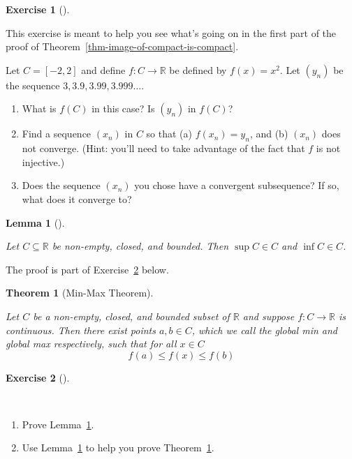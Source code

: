 \documentclass[
  letterpaper,
  DIV=11,
  numbers=noendperiod]{scrreprt}
\providecommand{\tightlist}{%
  \setlength{\itemsep}{0pt}\setlength{\parskip}{0pt}}
\def\R{\mathbb R}
\theoremstyle{plain}
\newtheorem{theorem}{Theorem}[chapter]
\theoremstyle{definition}
\newtheorem{exercise}{Exercise}[chapter]
\theoremstyle{plain}
\theoremstyle{plain}
\newtheorem{lemma}{Lemma}[chapter]
\theoremstyle{definition}
\theoremstyle{definition}
\theoremstyle{remark}
\begin{document}
\begin{exercise}[]\protect\hypertarget{exr-non-unique-preimage}{}\label{exr-non-unique-preimage}

This exercise is meant to help you see what's going on in the first part
of the proof of Theorem~\ref{thm-image-of-compact-is-compact}.

Let \(C=[-2,2]\) and define \(f:C\rightarrow\R\) be defined by
\(f(x)=x^2\). Let \((y_n)\) be the sequence \(3,3.9,3.99,3.999\ldots\).

\begin{enumerate}
\def\labelenumi{\arabic{enumi}.}
\tightlist
\item
  What is \(f(C)\) in this case? Is \((y_n)\) in \(f(C)\)?
\item
  Find a sequence \((x_n)\) in \(C\) so that (a) \(f(x_n)=y_n\), and (b)
  \((x_n)\) does not converge. (Hint: you'll need to take advantage of
  the fact that \(f\) is not injective.)
\item
  Does the sequence \((x_n)\) you chose have a convergent subsequence?
  If so, what does it converge to?
\end{enumerate}

\end{exercise}

\begin{lemma}[]\protect\hypertarget{lem-compact-contains-sup}{}\label{lem-compact-contains-sup}

Let \(C\subseteq\R\) be non-empty, closed, and bounded. Then
\(\sup C\in C\) and \(\inf C\in C\).

\end{lemma}

The proof is part of Exercise~\ref{exr-prove-min-max} below.

\begin{theorem}[Min-Max
Theorem]\protect\hypertarget{thm-min-max}{}\label{thm-min-max}

Let \(C\) be a non-empty, closed, and bounded subset of \(\R\) and
suppose \(f:C\rightarrow \R\) is continuous. Then there exist points
\(a,b\in C\), which we call the \emph{global min} and \emph{global max}
respectively, such that for all \(x\in C\) \[f(a)\leq f(x)\leq f(b)\]

\end{theorem}

\begin{exercise}[]\protect\hypertarget{exr-prove-min-max}{}\label{exr-prove-min-max}

~

\begin{enumerate}
\def\labelenumi{\arabic{enumi}.}
\tightlist
\item
  Prove Lemma~\ref{lem-compact-contains-sup}.
\item
  Use Lemma~\ref{lem-compact-contains-sup} to help you prove
  Theorem~\ref{thm-min-max}.
\end{enumerate}

\end{exercise}
\end{document}
